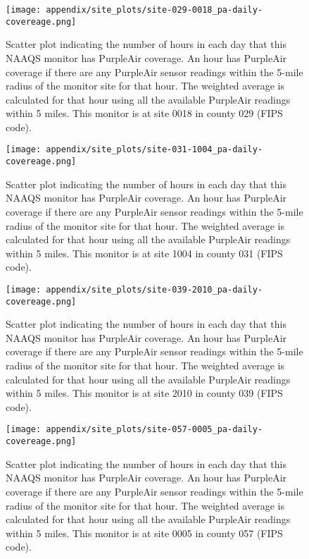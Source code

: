 \begin{figure}
\centering
\texttt{[image: appendix/site\_plots/site-029-0018\_pa-daily-covereage.png]}
\caption{Scatter plot indicating the number of hours in each day that this NAAQS monitor has PurpleAir coverage. An hour has PurpleAir coverage if there are any PurpleAir sensor readings within the 5-mile radius of the monitor site for that hour. The weighted average is calculated for that hour using all the available PurpleAir readings within 5 miles. This monitor is at site 0018 in county 029 (FIPS code).}
\label{fig:hourly_coverage_029-0018}
\end{figure}
\begin{figure}
\centering
\texttt{[image: appendix/site\_plots/site-031-1004\_pa-daily-covereage.png]}
\caption{Scatter plot indicating the number of hours in each day that this NAAQS monitor has PurpleAir coverage. An hour has PurpleAir coverage if there are any PurpleAir sensor readings within the 5-mile radius of the monitor site for that hour. The weighted average is calculated for that hour using all the available PurpleAir readings within 5 miles. This monitor is at site 1004 in county 031 (FIPS code).}
\label{fig:hourly_coverage_031-1004}
\end{figure}
\begin{figure}
\centering
\texttt{[image: appendix/site\_plots/site-039-2010\_pa-daily-covereage.png]}
\caption{Scatter plot indicating the number of hours in each day that this NAAQS monitor has PurpleAir coverage. An hour has PurpleAir coverage if there are any PurpleAir sensor readings within the 5-mile radius of the monitor site for that hour. The weighted average is calculated for that hour using all the available PurpleAir readings within 5 miles. This monitor is at site 2010 in county 039 (FIPS code).}
\label{fig:hourly_coverage_039-2010}
\end{figure}
\begin{figure}
\centering
\texttt{[image: appendix/site\_plots/site-057-0005\_pa-daily-covereage.png]}
\caption{Scatter plot indicating the number of hours in each day that this NAAQS monitor has PurpleAir coverage. An hour has PurpleAir coverage if there are any PurpleAir sensor readings within the 5-mile radius of the monitor site for that hour. The weighted average is calculated for that hour using all the available PurpleAir readings within 5 miles. This monitor is at site 0005 in county 057 (FIPS code).}
\label{fig:hourly_coverage_057-0005}
\end{figure}
